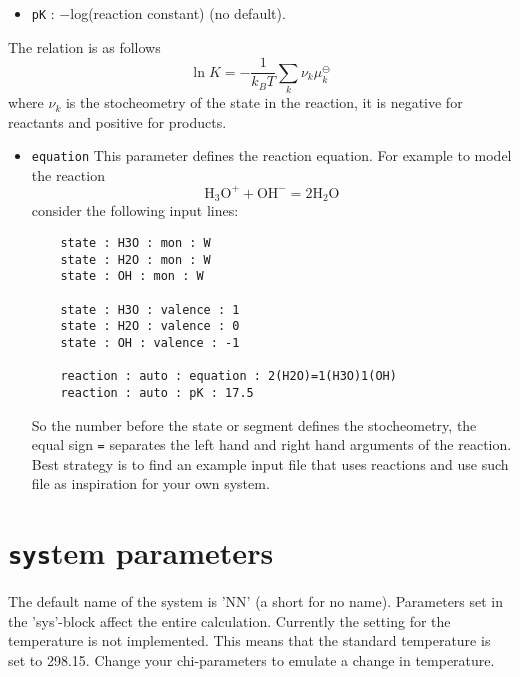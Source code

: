 \documentclass{article}
\begin{document}
\begin{itemize}
\item{\tt pK} : $-$log(reaction constant) (no default).
\end{itemize}

The relation is as follows
\begin{displaymath}
\ln{K}=-\frac{1}{k_B T}\sum_k{\nu_k \mu^\ominus_k}
\end{displaymath}
where $\nu_k$ is the stocheometry of the state in the reaction, it is negative for reactants and positive for products.


\begin{itemize}
\item{\tt equation} This parameter defines the reaction equation. For example to model the reaction
\begin{displaymath}
\mathrm{H_{3}O^{+} + OH^{-} = 2H_{2}O}
\end{displaymath}
consider the following input lines:
\begin{verbatim}
	state : H3O : mon : W
	state : H2O : mon : W
	state : OH : mon : W
     
	state : H3O : valence : 1
	state : H2O : valence : 0
	state : OH : valence : -1

	reaction : auto : equation : 2(H2O)=1(H3O)1(OH)
	reaction : auto : pK : 17.5
\end{verbatim}
So the number before the state or segment defines the stocheometry, the equal sign {\tt =} separates the left hand and right hand arguments of the reaction. Best strategy is to find an example input file that uses reactions and use such file as inspiration for your own system.

\end{itemize}

\section{{\tt sys}tem parameters}
\label{sec:system}

The default name of the system is 'NN' (a short for no name).
Parameters set in the 'sys'-block affect the entire calculation. Currently the setting for the temperature is not implemented. This means that the standard temperature is set to 298.15. Change your chi-parameters to emulate a change in temperature.
\end{document}
